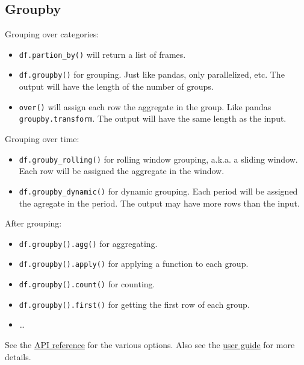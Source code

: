 \documentclass[
  letterpaper,
  DIV=11,
  numbers=noendperiod]{scrartcl}
\providecommand{\tightlist}{%
  \setlength{\itemsep}{0pt}\setlength{\parskip}{0pt}}\usepackage{longtable,booktabs,array}
\begin{document}
\hypertarget{groupby}{%
\subsection{Groupby}\label{groupby}}

Grouping over categories:

\begin{itemize}
\tightlist
\item
  \texttt{df.partion\_by()} will return a list of frames.
\item
  \texttt{df.groupby()} for grouping. Just like pandas, only
  parallelized, etc. The output will have the length of the number of
  groups.
\item
  \texttt{over()} will assign each row the aggregate in the group. Like
  pandas \texttt{groupby.transform}. The output will have the same
  length as the input.
\end{itemize}

Grouping over time:

\begin{itemize}
\tightlist
\item
  \texttt{df.grouby\_rolling()} for rolling window grouping, a.k.a. a
  sliding window. Each row will be assigned the aggregate in the window.
\item
  \texttt{df.groupby\_dynamic()} for dynamic grouping. Each period will
  be assigned the agregate in the period. The output may have more rows
  than the input.
\end{itemize}

After grouping:

\begin{itemize}
\tightlist
\item
  \texttt{df.groupby().agg()} for aggregating.
\item
  \texttt{df.groupby().apply()} for applying a function to each group.
\item
  \texttt{df.groupby().count()} for counting.
\item
  \texttt{df.groupby().first()} for getting the first row of each group.
\item
  \ldots{}
\end{itemize}

See the
\href{https://pola-rs.github.io/polars/py-polars/html/reference/dataframe/groupby.html}{API
reference} for the various options. Also see the
\href{https://pola-rs.github.io/polars-book/user-guide/howcani/timeseries/temporal_groupby.html}{user
guide} for more details.
\end{document}
